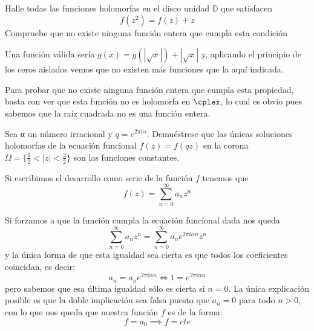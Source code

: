 \begin{problem}[5]
Halle todas las funciones holomorfas en el disco unidad $\mathbb{D}$ que satisfacen
\[f(z^2)=f(z)+z\]
Compruebe que no existe ninguna función entera que cumpla esta condición

\solution


Una función válida sería $g(x)=g(|\sqrt{x}|)+|\sqrt{x}|$ y, aplicando el principio de los ceros aislados vemos que no existen más funciones que la aquí indicada.

Para probar que no existe ninguna función entera que cumpla esta propiedad, basta con ver que esta función no es holomorfa en $\cplex$, lo cual es obvio pues sabemos que la raíz cuadrada no es una función entera.

\end{problem}

\begin{problem}[6]
Sea α un número irracional y $q=e^{2πiα}$. Demuéstrese que las únicas soluciones holomorfas de la ecuación funcional $f(z)=f(qz)$ en la corona $Ω = \{\frac{1}{2}<|z|<\frac{3}{2}\}$ son las funciones constantes.

\solution


Si escribimos el desarrollo como serie de la función $f$ tenemos que
\[f(z)=\sum_{n=0}^{\infty}a_n z^n\]

Si forzamos a que la función cumpla la ecuación funcional dada nos queda
\[\sum_{n=0}^{\infty}a_n z^n = \sum_{n=0}^{\infty}a_n e^{2πiαn}z^n\]
y la única forma de que esta igualdad sea cierta es que todos los coeficientes coincidan, es decir:
\[a_n=a_ne^{2πiαn} \iff 1 = e^{2πiαn}\]
pero sabemos que esa última igualdad sólo es cierta si $n=0$. La única explicación posible es que la doble implicación sea falsa puesto que $a_n=0$ para todo $n>0$, con lo que nos queda que nuestra función $f$ es de la forma:
\[f = a_0 \implies f=cte\]
\end{problem}

